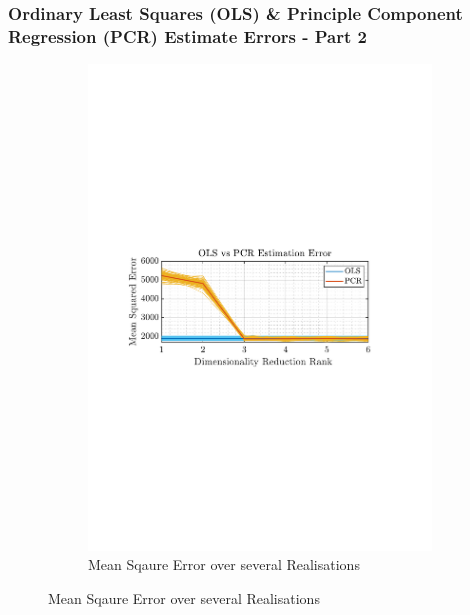 \documentclass[12pt]{article}
\begin{document}
 	\subsubsection{Ordinary Least Squares (OLS) \& Principle Component Regression (PCR)  Estimate Errors - Part 2}
	\begin{figure}[H]
 		\centering
 		\begin{subfigure}{0.49\textwidth}
 			\centering
 			\includegraphics[trim={2.2cm 11.2cm 3.15cm  11.2cm}, clip, width=\textwidth]{../MATLAB/figures/q1_6d_fig01.pdf} 
 			\captionsetup{justification=centering}
 			\caption{Mean Sqaure Error over several Realisations }
 		\end{subfigure}
 		\label{fig: 1-6d}
 	\end{figure}
\end{document}
